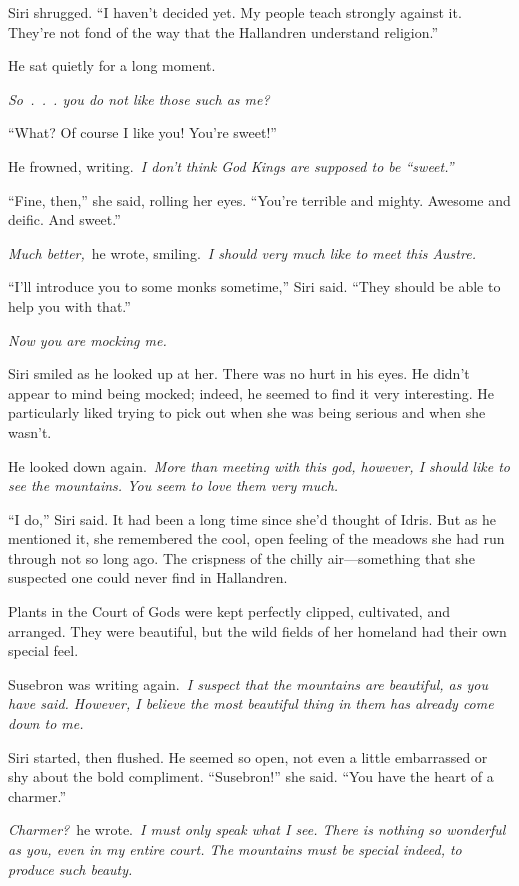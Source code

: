 Siri shrugged. “I haven’t decided yet. My people teach strongly against it. They’re not fond of the way that the Hallandren understand religion.”

He sat quietly for a long moment.

\textit{So~.~.~. you do not like those such as me?}

“What? Of course I like you! You’re sweet!”

He frowned, writing.~\textit{I don’t think God Kings are supposed to be “sweet.”}

“Fine, then,” she said, rolling her eyes. “You’re terrible and mighty. Awesome and deific. And sweet.”

\textit{Much better,}~he wrote, smiling.~\textit{I should very much like to meet this Austre.}

“I’ll introduce you to some monks sometime,” Siri said. “They should be able to help you with that.”

\textit{Now you are mocking me.}

Siri smiled as he looked up at her. There was no hurt in his eyes. He didn’t appear to mind being mocked; indeed, he seemed to find it very interesting. He particularly liked trying to pick out when she was being serious and when she wasn’t.

He looked down again.~\textit{More than meeting with this god, however, I should like to see the mountains. You seem to love them very much.}

“I do,” Siri said. It had been a long time since she’d thought of Idris. But as he mentioned it, she remembered the cool, open feeling of the meadows she had run through not so long ago. The crispness of the chilly air—something that she suspected one could never find in Hallandren.

Plants in the Court of Gods were kept perfectly clipped, cultivated, and arranged. They were beautiful, but the wild fields of her homeland had their own special feel.

Susebron was writing again.~\textit{I suspect that the mountains are beautiful, as you have said. However, I believe the most beautiful thing in them has already come down to me.}

Siri started, then flushed. He seemed so open, not even a little embarrassed or shy about the bold compliment. “Susebron!” she said. “You have the heart of a charmer.”

\textit{Charmer?}~he wrote.~\textit{I must only speak what I see. There is nothing so wonderful as you, even in my entire court. The mountains must be special indeed, to produce such beauty.}

